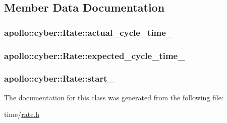\subsection{Member Data Documentation}
\hypertarget{classapollo_1_1cyber_1_1Rate_aca1869f7d2d01493446fc266b01e3a21}{
\subsubsection[{actual\-\_\-cycle\-\_\-time\-\_\-}]{ apollo\-::cyber\-::\-Rate\-::actual\-\_\-cycle\-\_\-time\-\_\-\hspace{0.3cm}{\ttfamily [private]}}}\label{classapollo_1_1cyber_1_1Rate_aca1869f7d2d01493446fc266b01e3a21}
\hypertarget{classapollo_1_1cyber_1_1Rate_a12b46377964c965f263e5014fc1d359a}{
\subsubsection[{expected\-\_\-cycle\-\_\-time\-\_\-}]{ apollo\-::cyber\-::\-Rate\-::expected\-\_\-cycle\-\_\-time\-\_\-\hspace{0.3cm}{\ttfamily [private]}}}\label{classapollo_1_1cyber_1_1Rate_a12b46377964c965f263e5014fc1d359a}
\hypertarget{classapollo_1_1cyber_1_1Rate_a2954553100471ee5dfb8042ca86e9715}{
\subsubsection[{start\-\_\-}]{ apollo\-::cyber\-::\-Rate\-::start\-\_\-\hspace{0.3cm}{\ttfamily [private]}}}\label{classapollo_1_1cyber_1_1Rate_a2954553100471ee5dfb8042ca86e9715}


The documentation for this class was generated from the following file\-:\begin{DoxyCompactItemize}
\item 
time/\hyperlink{rate_8h}{rate.\-h}\end{DoxyCompactItemize}
